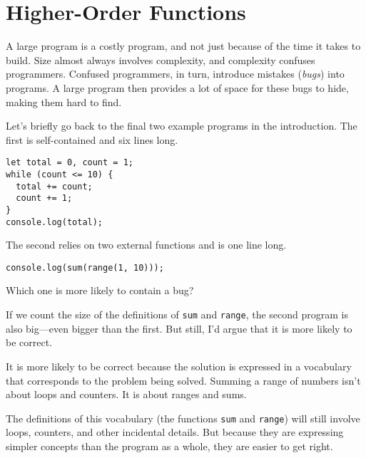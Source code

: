 \chapter{Higher-Order Functions}\label{higher_order}


A large program is a costly program, and not just because of the time it takes to build. Size almost always involves complexity, and complexity confuses programmers. Confused programmers, in turn, introduce mistakes (\emph{bugs}) into programs. A large program then provides a lot of space for these bugs to hide, making them hard to find.

Let's briefly go back to the final two example programs in the introduction. The first is self-contained and six lines long.

\begin{lstlisting}
let total = 0, count = 1;
while (count <= 10) {
  total += count;
  count += 1;
}
console.log(total);
\end{lstlisting}
\noindent

The second relies on two external functions and is one line long.

\begin{lstlisting}
console.log(sum(range(1, 10)));
\end{lstlisting}
\noindent

Which one is more likely to contain a bug?

If we count the size of the definitions of \lstinline`sum` and \lstinline`range`, the second program is also big—even bigger than the first. But still, I'd argue that it is more likely to be correct.

It is more likely to be correct because the solution is expressed in a vocabulary that corresponds to the problem being solved. Summing a range of numbers isn't about loops and counters. It is about ranges and sums.

The definitions of this vocabulary (the functions \lstinline`sum` and \lstinline`range`) will still involve loops, counters, and other incidental details. But because they are expressing simpler concepts than the program as a whole, they are easier to get right.

